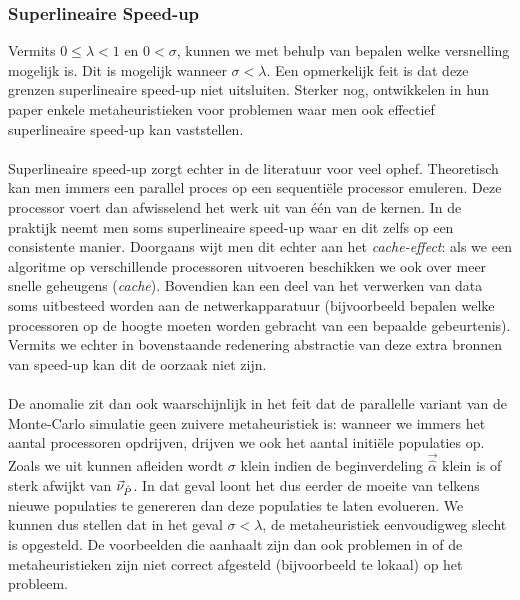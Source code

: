 \subsubsection{Superlineaire Speed-up}

Vermits $0\leq\lambda<1$ en $0<\sigma$, kunnen we met behulp van  bepalen welke versnelling mogelijk is. Dit is mogelijk wanneer $\sigma<\lambda$. Een opmerkelijk feit is dat deze grenzen superlineaire speed-up niet uitsluiten. Sterker nog, \cite{DBLP:journals/jc/ShonkwilerV94} ontwikkelen in hun paper enkele metaheuristieken voor problemen waar men ook effectief superlineaire speed-up kan vaststellen.

\paragraph{}

Superlineaire speed-up zorgt echter in de literatuur voor veel ophef\cite{superlinearSpeedup}. Theoretisch kan men immers een parallel proces op een sequenti\"ele processor emuleren. Deze processor voert dan afwisselend het werk uit van \'e\'en van de kernen. In de praktijk neemt men soms superlineaire speed-up waar en dit zelfs op een consistente manier. Doorgaans wijt men dit echter aan het \emph{cache-effect}: als we een algoritme op verschillende processoren uitvoeren beschikken we ook over meer snelle geheugens (\emph{cache}). Bovendien kan een deel van het verwerken van data soms uitbesteed worden aan de netwerkapparatuur (bijvoorbeeld bepalen welke processoren op de hoogte moeten worden gebracht van een bepaalde gebeurtenis). Vermits we echter in bovenstaande redenering abstractie van deze extra bronnen van speed-up kan dit de oorzaak niet zijn.

\paragraph{}

De anomalie zit dan ook waarschijnlijk in het feit dat de parallelle variant van de Monte-Carlo simulatie geen zuivere metaheuristiek is: wanneer we immers het aantal processoren opdrijven, drijven we ook het aantal initi\"ele populaties op. Zoals we uit  kunnen afleiden wordt $\sigma$ klein indien de beginverdeling $\vec{\hat{\alpha}}$ klein is of sterk afwijkt van $\evr[\hat{P}]$. In dat geval loont het dus eerder de moeite van telkens nieuwe populaties te genereren dan deze populaties te laten evolueren. We kunnen dus stellen dat in het geval $\sigma<\lambda$, de metaheuristiek eenvoudigweg slecht is opgesteld. De voorbeelden die \cite{DBLP:journals/jc/ShonkwilerV94} aanhaalt zijn dan ook problemen in  of de metaheuristieken zijn niet correct afgesteld (bijvoorbeeld te lokaal) op het probleem.

